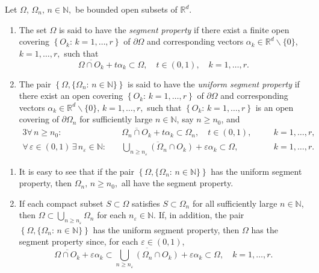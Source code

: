 \documentclass[a4paper,reqno]{amsart}
\begin{document}
\begin{definition}
 Let $\Omega,\, \Omega_n, \,n\in{\mathbb{N}},$ be bounded open subsets of ${\mathbb{R}}^d$.
\begin{enumerate}[label=\rm{\roman{*})}]
\item The set $\Omega$ is said to have the \emph{segment property} if  there exist a finite open covering   $\left\{O_k:\,k=1,\dots,r\right\}$ of $\partial\Omega$
and corresponding vectors 
 $\alpha_k\in{\mathbb{R}}^d\backslash\{0\}$, $k=1,\dots,r,$ such that 
$$\overline{\Omega\cap O_k}+t\alpha_k\subset\Omega, \quad t\in(0,1),  \quad k=1,\dots,r.$$
\item The pair  $\left\{\Omega, \{\Omega_n:\,n\in{\mathbb{N}}\}\right\}$ is said to have the \emph{uniform segment property} if there exist an open covering   $\left\{O_k:\,k=1,\dots,r\right\}$ of $\partial\Omega$
and corresponding vectors 
$\alpha_k\in{\mathbb{R}}^d\backslash\{0\}, \,k=1,\dots,r,$ such that  $\left\{O_k:\,k=1,\dots,r\right\}$  is an open covering of $\partial\Omega_n$ for sufficiently large $n\in{\mathbb{N}}$, say $n\geq n_0$,
and
\begin{alignat*}{3} 
 \forall\,n\geq n_0:\quad &\overline{\Omega_n\cap O_k}+t\alpha_k\subset\Omega_n, \quad t\in(0,1),  \quad&&k=1,\dots,r,\\
\forall\,\varepsilon\in(0,1)\,\exists\,n_\varepsilon\in{\mathbb{N}}:\quad &\overline{\underset{n\geq n_\varepsilon}{\bigcup}\left(\Omega_n\cap O_k\right)}+\varepsilon\alpha_k\subset\Omega, \quad &&k=1,\dots,r.
\end{alignat*}
\end{enumerate}
\end{definition}

\begin{rem}\label{remsegmentprop}
\begin{enumerate}[label=\rm{\roman{*})}]
 \item 
It is easy to see that if the pair  $\left\{\Omega, \{\Omega_n:\,n\in{\mathbb{N}}\}\right\}$  has the uniform segment property, then $\Omega_n, \,n\geq n_0,$ all have the segment property.
\item 
If each compact subset $S\subset\Omega$ satisfies $S\subset\Omega_n$ for all sufficiently large $n\in{\mathbb{N}}$, then $\Omega\subset\bigcup_{n\geq n_\varepsilon}\Omega_n$ for each $n_\varepsilon\in{\mathbb{N}}$.
If, in addition, the pair  $\left\{\Omega, \{\Omega_n:\,n\in{\mathbb{N}}\}\right\}$  has the uniform segment property, then $\Omega$ has the segment property
since, for each $\varepsilon\in (0,1)$, $$\overline{\Omega\cap O_k}+\varepsilon\alpha_k\subset\overline{\underset{n\geq n_\varepsilon}{\bigcup}\left(\Omega_n\cap O_k\right)}+\varepsilon\alpha_k\subset\Omega,\quad k=1,\dots,r.$$
\end{enumerate}
\end{rem}
\end{document}
